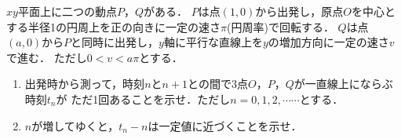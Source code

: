 \documentclass[../../main.tex]{subfiles}
\begin{document}
$xy$平面上に二つの動点$P$，$Q$がある．
$P$は点$(1,0)$から出発し，原点$O$を中心とする半径1の円周上を正の向きに一定の速さ$\pi$(円周率)で回転する．
$Q$は点$(a,0)$から$P$と同時に出発し，$y$軸に平行な直線上を$y$の増加方向に一定の速さ$v$で進む．
ただし$0<v<a\pi$とする．
\begin{enumerate}
  \item 出発時から測って，時刻$n$と$n+1$との間で3点$O$，$P$，$Q$が一直線上にならぶ時刻$t_n$が
    ただ1回あることを示せ．ただし$n=0,1,2,\cdots\cdots$とする．
  \item $n$が増してゆくと，$t_n-n$は一定値に近づくことを示せ．
\end{enumerate}
\end{document}

